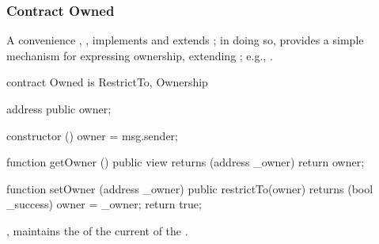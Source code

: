\subsubsection{Contract Owned}

A convenience , , implements
 and extends ; in doing so,
 provides a simple mechanism for expressing 
ownership, extending ; e.g., .


\begin{solidity}
contract Owned is RestrictTo, Ownership {
  address public owner;

  constructor () {
    owner = msg.sender;
  }

  function getOwner () public view returns (address _owner) {
    return owner;
  }

  function setOwner (address _owner) public restrictTo(owner) returns (bool _success) {
    owner = _owner;
    return true;
  }
}
\end{solidity}

\begin{state}
  \begin{public}
    \item {}, maintains the  of the current
       of the .
  \end{public}
\end{state}

